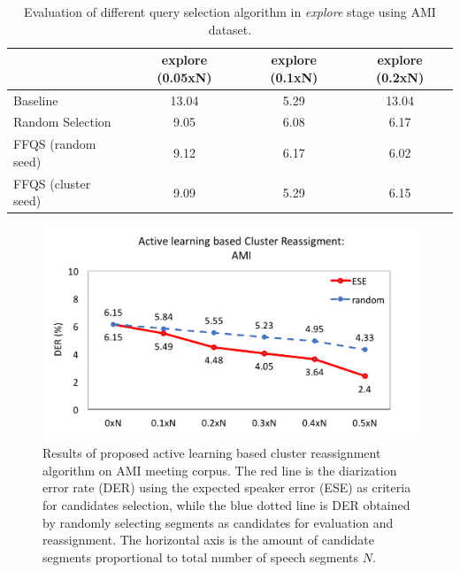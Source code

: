 \documentclass[journal]{IEEEtran}
\begin{document}
\begin{table}[]
	\centering
	\caption{Evaluation of different query selection algorithm in \textit{explore} stage using AMI dataset.}
	\label{ffqs}
	\begin{tabular}{@{}lccc@{}}
		\toprule
		& explore (0.05xN)  & explore (0.1xN)  & explore (0.2xN)   \\ \midrule
		Baseline            & 13.04 & 5.29 & 13.04 \\ \midrule
		Random Selection    & 9.05  & 6.08 & 6.17  \\ \midrule
		FFQS (random seed)  & 9.12  & 6.17 & 6.02  \\ \midrule
		FFQS (cluster seed) & 9.09  & 5.29 & 6.15  \\ \bottomrule
	\end{tabular}
\end{table}
\begin{figure}
	\includegraphics[width=\linewidth]{figs/exp2_2}
	\caption{Results of proposed active learning based cluster reassignment algorithm on AMI meeting corpus. The red line is the diarization error rate (DER) using the expected speaker error (ESE) as criteria for candidates selection, while the blue dotted line is DER obtained by randomly selecting segments as candidates for evaluation and reassignment. The horizontal axis is the amount of candidate segments proportional to total number of speech segments $N$.}
	\label{exp2_1}
\end{figure}
\end{document}
